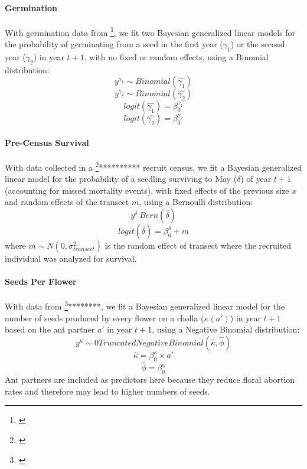 \documentclass[11pt]{article}
\newcommand{\tom}[2]{{\color{red}{#1}}\footnote{\textit{\color{red}{#2}}}}
\begin{document}
\paragraph{Germination}
With germination data from \tom{Miller et al., 2007}{CITE}, we fit two Bayesian generalized linear models for the probability of germinating from a seed in the first year ($\gamma_1$) or the second year ($\gamma_2$) in year $t+1$, with no fixed or random effects, using a Binomial distribution:
$$y^{\gamma_1} \sim Binomial(\hat{\gamma_1})$$
$$y^{\gamma_2} \sim Binomial(\hat{\gamma_2})$$
$$logit(\hat{\gamma_1}) = \beta_{0}^{\gamma_1}$$
$$logit(\hat{\gamma_2}) = \beta_{0}^{\gamma_2}$$

\paragraph{Pre-Census Survival}
With data collected in a \tom{2005-2006}{FIX}********** recruit census, we fit a Bayesian generalized linear model for the probability of a seedling surviving to May ($\delta$) of year $t+1$ (accounting for missed mortality events), with fixed effects of the previous size $x$ and random effects of the transect $m$, using a Bernoulli distribution: 
$$y^{\delta} ~ Bern(\hat{\delta})$$
$$logit(\hat{\delta}) = \beta_{0}^{\delta} + m$$
 where $m \sim N(0, \sigma_{transect}^2)$ is the random effect of transect where the recruited individual was analyzed for survival.

\paragraph{Seeds Per Flower}
With data from \tom{Miller 2007}{CITE}********, we fit a Bayesian generalized linear model for the number of seeds produced by every flower on a cholla ($\kappa(a')$) in year $t+1$ based on the ant partner $a'$ in year $t+1$, using a Negative Binomial distribution:
$$y^{\kappa} \sim 0 Truncated Negative Binomial(\hat{\kappa},\hat{\phi})$$
$$ \hat{\kappa } = \beta_{0}^{\kappa} \times a'$$
$$\hat{\phi} = \beta_{0}^{\phi}$$
Ant partners are included as predictors here because they reduce floral abortion rates and therefore may lead to higher numbers of seeds. 
\end{document}
